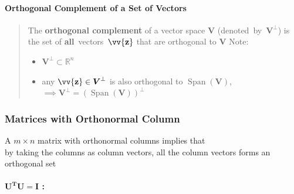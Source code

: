 \documentclass[11pt]{article}
\DeclareRobustCommand{\myvec}[1]{\vv{\mathbf{#1}}}
\newcommand{\mysubvecsp}[1]{\bm{{#1}}}
\newcommand{\mymat}[1]{#1}
\begin{document}
    \paragraph{Orthogonal Complement of a Set of Vectors} 
    
    \begin{quote}
        The \textbf{orthogonal complement} of a vector space $\mysubvecsp{V}$ (denoted~by~$\mysubvecsp{V}^{\perp}$) is the set of \textbf{all}~vectors~$\myvec{z}$ that are orthogonal to $\mysubvecsp{V}$
        \vspace{1ex}
        Note:
        \begin{itemize}
            \item $\mysubvecsp{V}^{\perp} \subset \mathbb{R}^n$
            \item any $\myvec{z} \in \mysubvecsp{V}^{\perp}$ is also orthogonal to $\operatorname{Span}(\mysubvecsp{V})$, $\implies \mysubvecsp{V}^{\perp} = (\operatorname{Span}(\mysubvecsp{V}))^{\perp}$
        \end{itemize}
    \end{quote}
    
    \newpage
    \subsubsection{Matrices with Orthonormal Column} \label{section3_5_3}
    A $m \times n$ matrix with orthonormal columns implies that \\
    by taking the columns as column vectors, all the column vectors forms an orthogonal set
    
    \paragraph{$\bm{\mymat{U}^T \mymat{U} = \mymat{I}}$ :}\mbox{}\vspace{1ex}
\end{document}
